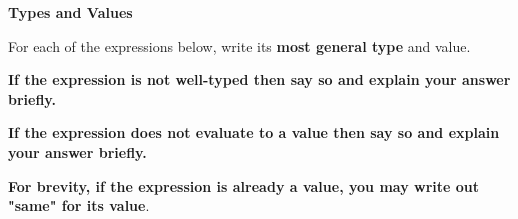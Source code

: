 \documentclass[addpoints,12pt]{exam}
\begin{document}
\begin{questions}

\textbf{Types and Values}

For each of the expressions below, write its \textbf{most general type} and value.

\textbf{If the expression is not well-typed then say so and explain your answer briefly.}

\textbf{If the expression does not evaluate to a value then say so and explain your answer briefly.}

\textbf{For brevity, if the expression is already a value, you may write out "same" for its value}.

\end{questions}
\end{document}
